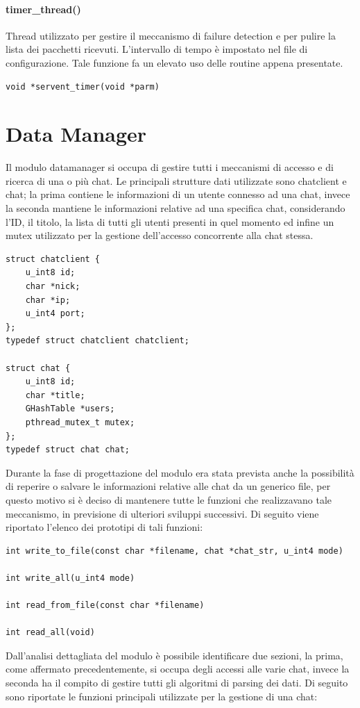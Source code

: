 \paragraph{timer\_thread()}
Thread utilizzato per gestire il meccanismo di failure detection e per pulire la lista dei pacchetti ricevuti. L'intervallo di tempo è impostato nel file di configurazione. Tale funzione fa un elevato uso delle routine appena presentate.
\begin{lstlisting}[frame=trBL]
void *servent_timer(void *parm)
\end{lstlisting}

\section{Data Manager}
Il modulo datamanager si occupa di gestire tutti i meccanismi di accesso e di ricerca di una o più chat. Le principali strutture dati utilizzate sono chatclient e chat; la prima contiene le informazioni di un utente connesso ad una chat, invece la seconda mantiene le informazioni relative ad una specifica chat, considerando l'ID, il titolo, la lista di tutti gli utenti presenti in quel momento ed infine un mutex utilizzato per la gestione dell'accesso concorrente alla chat stessa. 
\begin{lstlisting}
struct chatclient {
	u_int8 id;
	char *nick;
	char *ip;
	u_int4 port;
};
typedef struct chatclient chatclient;

struct chat {
	u_int8 id;
	char *title;
	GHashTable *users;
	pthread_mutex_t mutex;
};
typedef struct chat chat;
\end{lstlisting}
Durante la fase di progettazione del modulo era stata prevista anche la possibilità di reperire o salvare le informazioni relative alle chat da un generico file, per questo motivo si è deciso di mantenere tutte le funzioni che realizzavano tale meccanismo, in previsione  di ulteriori sviluppi successivi. Di seguito viene riportato l'elenco dei prototipi di tali funzioni:
\begin{lstlisting}
int write_to_file(const char *filename, chat *chat_str, u_int4 mode)

int write_all(u_int4 mode)

int read_from_file(const char *filename)

int read_all(void)
\end{lstlisting}  
Dall'analisi dettagliata del modulo è possibile identificare due sezioni, la prima, come affermato precedentemente, si occupa degli accessi alle varie chat, invece la seconda ha il compito di gestire tutti gli algoritmi di parsing dei dati. Di seguito sono riportate le funzioni principali utilizzate per la gestione di una chat:
